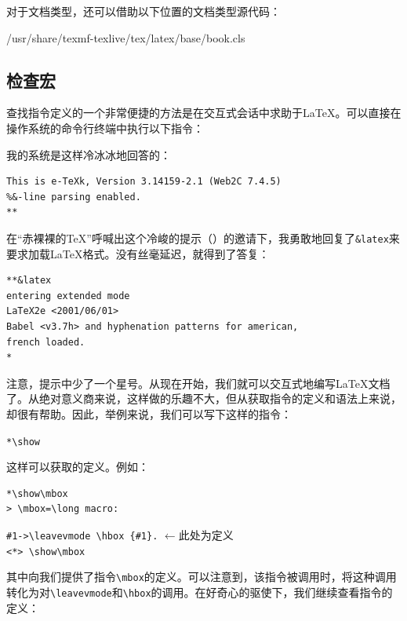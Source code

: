 对于文档类型，还可以借助以下位置的文档类型源代码：

\begin{dmd}
/usr/share/texmf-texlive/tex/latex/base/book.cls
\end{dmd}

\subsection{检查宏}

查找指令定义的一个非常便捷的方法是在交互式会话中求助于\LaTeX 。可以直接在操作系统的命令行终端中执行以下指令：


我的系统是这样冷冰冰地回答的：

\begin{dmd}
\begin{verbatim}
This is e-TeXk, Version 3.14159-2.1 (Web2C 7.4.5)
%&-line parsing enabled.
**\end{verbatim}
\end{dmd}

在“赤裸裸的\TeX ”呼喊出这个冷峻的提示（\dm{**}）的邀请下，我勇敢地回复了\verb|&latex|来要求加载\LaTeX 格式。没有丝毫延迟，就得到了答复：

\begin{dmd}
\begin{verbatim}
**&latex
entering extended mode
LaTeX2e <2001/06/01>
Babel <v3.7h> and hyphenation patterns for american,
french loaded.
*\end{verbatim}
\end{dmd}

注意，提示中少了一个星号。从现在开始，我们就可以交互式地编写\LaTeX 文档了。从绝对意义商来说，这样做的乐趣不大，但从获取指令的定义和语法上来说，却很有帮助。因此，举例来说，我们可以写下这样的指令：

\begin{dmd}
\verb|*\show|
\end{dmd}

这样可以获取的定义。例如：

\begin{dmd}
\begin{verbatim}
*\show\mbox
> \mbox=\long macro:\end{verbatim}
\verb|#1->\leavevmode \hbox {#1}.| \quad $\leftarrow$\textsf{此处为定义}\\
\verb+<*> \show\mbox+
\end{dmd}

其中向我们提供了指令\verb|\mbox|的定义。可以注意到，该指令被调用时，将这种调用转化为对\verb|\leavevmode|和\verb|\hbox|的调用。在好奇心的驱使下，我们继续查看指令的定义：


